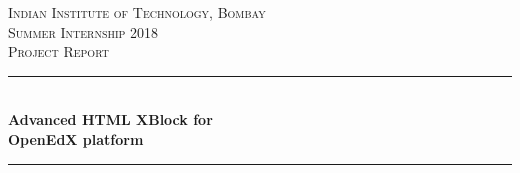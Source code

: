 \documentclass[a4paper, 12pt]{article}
\begin{document}
\begin{titlepage}

\newcommand{\HRule}{\rule{\linewidth}{0.5mm}} %

\center %
 

\textsc{\LARGE Indian Institute of Technology, Bombay}\\[1.5cm] %
\textsc{\Large Summer Internship 2018}\\[0.5cm] %
\textsc{\large Project Report}\\[0.5cm] %


\HRule \\[0.2cm]
{ \huge \bfseries Advanced HTML XBlock for\\[0.2cm] OpenEdX platform}\\[0.2cm] %
\HRule \\[1.0cm]
 

\end{titlepage}
\end{document}

